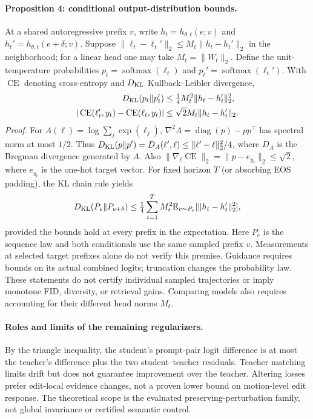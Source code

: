 \paragraph{Proposition 4: conditional output-distribution bounds.}
At a shared autoregressive prefix $v$, write $h_t=h_{\theta,t}(e;v)$ and
$h_t'=h_{\theta,t}(e+\delta;v)$. Suppose
$\|\ell_t-\ell_t'\|_2\le M_t\|h_t-h_t'\|_2$ in the neighborhood;
for a linear head one may take $M_t=\|W_t\|_2$. Define the unit-temperature
probabilities $p_t=\operatorname{softmax}(\ell_t)$ and
$p_t'=\operatorname{softmax}(\ell_t')$. With $\operatorname{CE}$ denoting
cross-entropy and $D_{\rm KL}$ Kullback--Leibler divergence,
\begin{equation}
\begin{aligned}
 D_{\rm KL}(p_t\|p_t')&\le\tfrac14 M_t^2\|h_t-h_t'\|_2^2,\\
 |\operatorname{CE}(\ell_t',y_t)-\operatorname{CE}(\ell_t,y_t)|
 &\le\sqrt{2}M_t\|h_t-h_t'\|_2.
\end{aligned}
\label{eq:theory_output_bounds}
\end{equation}
\emph{Proof.} For $A(\ell)=\log\sum_j\exp(\ell_j)$,
$\nabla^2A=\operatorname{diag}(p)-pp^\top$ has spectral norm at most $1/2$.
Thus $D_{\rm KL}(p\|p')=D_A(\ell',\ell)\le\|\ell'-\ell\|_2^2/4$,
where $D_A$ is the Bregman divergence generated by $A$.
Also $\|\nabla_\ell\operatorname{CE}\|_2=\|p-e_{y_t}\|_2\le\sqrt2$,
where $e_{y_t}$ is the one-hot target vector.
For fixed horizon $T$ (or absorbing EOS padding), the KL chain rule yields
\begin{equation}
 D_{\rm KL}(P_e\|P_{e+\delta})
 \le\tfrac14\sum_{t=1}^T M_t^2
 \mathbb E_{v\sim P_e}[\|h_t-h_t'\|_2^2],
\label{eq:theory_sequence_kl}
\end{equation}
provided the bounds hold at every prefix in the expectation. Here $P_e$ is
the sequence law and both conditionals use the same sampled prefix $v$.
Measurements at selected target prefixes alone do not verify this premise.
Guidance requires bounds on its actual combined logits; truncation changes
the probability law. These statements do not certify individual sampled
trajectories or imply monotone FID, diversity, or retrieval gains. Comparing
models also requires accounting for their different head norms $M_t$.

\paragraph{Roles and limits of the remaining regularizers.}
By the triangle inequality, the student's prompt-pair logit difference is at
most the teacher's difference plus the two student--teacher residuals.
Teacher matching limits drift but does not guarantee improvement over the
teacher.
Altering losses prefer edit-local evidence changes, not a proven lower bound
on motion-level edit response. The theoretical scope is the evaluated
preserving-perturbation family, not global invariance or certified semantic
control.
